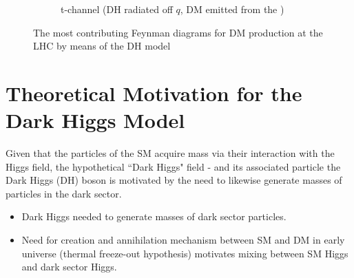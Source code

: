 \begin{figure}[hp]
\begin{subfigure}[t]{.42\textwidth}
%
%
%
%
	\caption{t-channel (DH radiated off \(q\), DM emitted from the \Zprime)}
	\end{subfigure}
	\caption{The most contributing Feynman diagrams for DM production at the LHC by means of the DH model}
	\label{fig:Feynman_DH}
\end{figure}


\section{Theoretical Motivation for the Dark Higgs Model}

Given that the particles of the SM acquire mass via their interaction with the Higgs field,  the hypothetical ``Dark Higgs" field - and its associated particle the Dark Higgs (DH) boson is motivated by the need to likewise generate masses of particles in the dark sector.

\begin{itemize}
\item Dark Higgs needed to generate masses of dark sector particles.
\item Need for creation and annihilation mechanism between SM and DM in early universe (thermal freeze-out hypothesis) motivates mixing between SM Higgs and dark sector Higgs.
\end{itemize}

